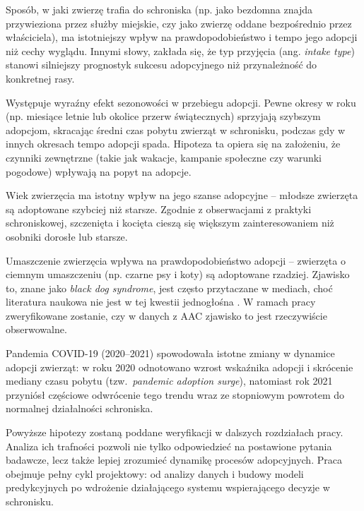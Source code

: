 \begin{description}\itemsep2pt
\item[H1:] Sposób, w jaki zwierzę trafia do schroniska (np. jako bezdomna znajda przywieziona przez służby miejskie, czy jako zwierzę oddane bezpośrednio przez właściciela), ma istotniejszy wpływ na prawdopodobieństwo i tempo jego adopcji niż cechy wyglądu. Innymi słowy, zakłada się, że typ przyjęcia (ang. \emph{intake type}) stanowi silniejszy prognostyk sukcesu adopcyjnego niż przynależność do konkretnej rasy.

\item[H2:] Występuje wyraźny efekt sezonowości w przebiegu adopcji. Pewne okresy w roku (np. miesiące letnie lub okolice przerw świątecznych) sprzyjają szybszym adopcjom, skracając średni czas pobytu zwierząt w schronisku, podczas gdy w innych okresach tempo adopcji spada. Hipoteza ta opiera się na założeniu, że czynniki zewnętrzne (takie jak wakacje, kampanie społeczne czy warunki pogodowe) wpływają na popyt na adopcje.

\item[H3:] Wiek zwierzęcia ma istotny wpływ na jego szanse adopcyjne – młodsze zwierzęta są adoptowane szybciej niż starsze. Zgodnie z obserwacjami z praktyki schroniskowej, szczenięta i kocięta cieszą się większym zainteresowaniem niż osobniki dorosłe lub starsze.

\item[H4:] Umaszczenie zwierzęcia wpływa na prawdopodobieństwo adopcji – zwierzęta o ciemnym umaszczeniu (np. czarne psy i koty) są adoptowane rzadziej. Zjawisko to, znane jako \emph{black dog syndrome}, jest często przytaczane w mediach, choć literatura naukowa nie jest w tej kwestii jednogłośna \cite{svoboda2015}. W ramach pracy zweryfikowane zostanie, czy w danych z AAC zjawisko to jest rzeczywiście obserwowalne.


\item[H5:] Pandemia COVID-19 (2020--2021) spowodowała istotne zmiany w dynamice adopcji zwierząt: w roku 2020 odnotowano wzrost wskaźnika adopcji i skrócenie mediany czasu pobytu (tzw.\ \emph{pandemic adoption surge}), natomiast rok 2021 przyniósł częściowe odwrócenie tego trendu wraz ze stopniowym powrotem do normalnej działalności schroniska.
\end{description}


Powyższe hipotezy zostaną poddane weryfikacji w dalszych rozdziałach pracy. Analiza ich trafności pozwoli nie tylko odpowiedzieć na postawione pytania badawcze, lecz także lepiej zrozumieć dynamikę procesów adopcyjnych. Praca obejmuje pełny cykl projektowy: od analizy danych i budowy modeli predykcyjnych po wdrożenie działającego systemu wspierającego decyzje w schronisku.

